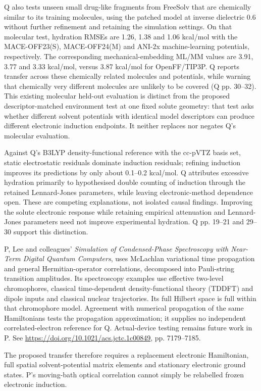 \documentclass{article}
\begin{document}
Q also tests unseen small drug-like fragments from FreeSolv that are chemically similar to its training molecules, using the patched model at inverse dielectric 0.6 without further refinement and retaining the simulation settings. On that molecular test, hydration RMSEs are 1.26, 1.38 and 1.06 kcal/mol with the MACE-OFF23(S), MACE-OFF24(M) and ANI-2x machine-learning potentials, respectively. The corresponding mechanical-embedding ML/MM values are 3.91, 3.77 and 3.33 kcal/mol, versus 3.87 kcal/mol for OpenFF/TIP3P. Q reports transfer across these chemically related molecules and potentials, while warning that chemically very different molecules are unlikely to be covered (Q pp. 30--32). This existing molecular held-out evaluation is distinct from the proposed descriptor-matched environment test at one fixed solute geometry: that test asks whether different solvent potentials with identical model descriptors can produce different electronic induction endpoints. It neither replaces nor negates Q's molecular evaluation.

Against Q's B3LYP density-functional reference with the cc-pVTZ basis set, static electrostatic residuals dominate induction residuals; refining induction improves its predictions by only about 0.1--0.2 kcal/mol. Q attributes excessive hydration primarily to hypothesised double counting of induction through the retained Lennard-Jones parameters, while leaving electronic-method dependence open. These are competing explanations, not isolated causal findings. Improving the solute electronic response while retaining empirical attenuation and Lennard-Jones parameters need not improve experimental hydration. Q pp. 19--21 and 29--30 support this distinction.

P, Lee and colleagues' \emph{Simulation of Condensed-Phase Spectroscopy with Near-Term Digital Quantum Computers}, uses McLachlan variational time propagation and general Hermitian-operator correlations, decomposed into Pauli-string transition amplitudes. Its spectroscopy examples use effective two-level chromophores, classical time-dependent density-functional theory (TDDFT) and dipole inputs and classical nuclear trajectories. Its full Hilbert space is full within that chromophore model. Agreement with numerical propagation of the same Hamiltonians tests the propagation approximation; it supplies no independent correlated-electron reference for Q. Actual-device testing remains future work in P. See \url{https://doi.org/10.1021/acs.jctc.1c00849}, pp. 7179--7185.

The proposed transfer therefore requires a replacement electronic Hamiltonian, full spatial solvent-potential matrix elements and stationary electronic ground states. P's moving-bath optical correlation cannot simply be relabelled frozen electronic induction.
\end{document}
